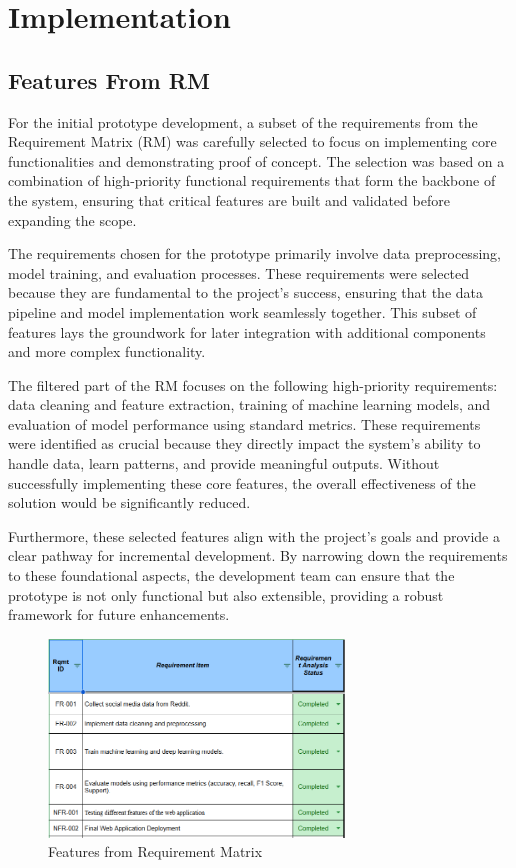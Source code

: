 
\pagebreak

\section{Implementation}
\subsection{Features From RM}
\noindent
For the initial prototype development, a subset of the requirements from the Requirement Matrix (RM) was carefully selected to focus on implementing core functionalities and demonstrating proof of concept. The selection was based on a combination of high-priority functional requirements that form the backbone of the system, ensuring that critical features are built and validated before expanding the scope.

The requirements chosen for the prototype primarily involve data preprocessing, model training, and evaluation processes. These requirements were selected because they are fundamental to the project's success, ensuring that the data pipeline and model implementation work seamlessly together. This subset of features lays the groundwork for later integration with additional components and more complex functionality.

The filtered part of the RM focuses on the following high-priority requirements: data cleaning and feature extraction, training of machine learning models, and evaluation of model performance using standard metrics. These requirements were identified as crucial because they directly impact the system's ability to handle data, learn patterns, and provide meaningful outputs. Without successfully implementing these core features, the overall effectiveness of the solution would be significantly reduced.

Furthermore, these selected features align with the project’s goals and provide a clear pathway for incremental development. By narrowing down the requirements to these foundational aspects, the development team can ensure that the prototype is not only functional but also extensible, providing a robust framework for future enhancements.

\begin{figure}[h!]  
    \centering
    \includegraphics[width=0.7\textwidth]{Images/RM_part_for_implementation.png}  
    \caption{Features from Requirement Matrix}
    \label{Features from Requirement Matrix}  %
\end{figure}

